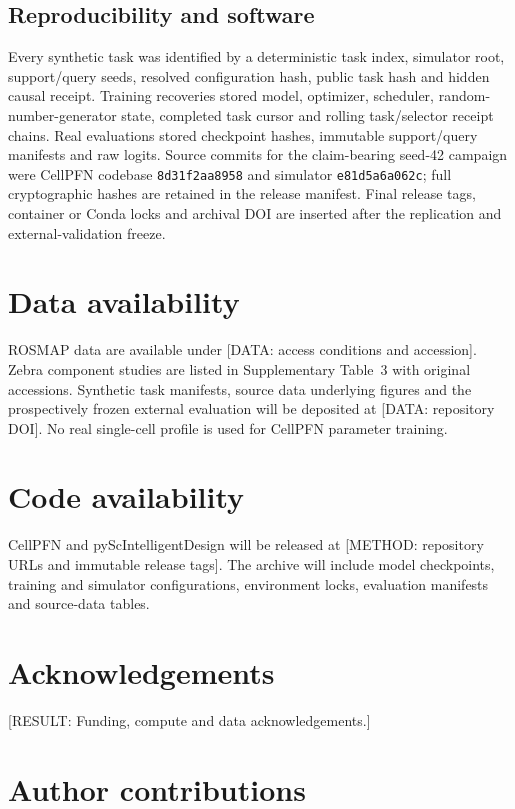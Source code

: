\documentclass[12pt]{article}
\newcommand{\resultplaceholder}[1]{\textcolor{red!75!black}{[RESULT: #1]}}
\newcommand{\methodplaceholder}[1]{\textcolor{blue!70!black}{[METHOD: #1]}}
\newcommand{\dataplaceholder}[1]{\textcolor{purple!70!black}{[DATA: #1]}}
\newcommand{\code}[1]{\texttt{#1}}
\begin{document}
\subsection*{Reproducibility and software}

Every synthetic task was identified by a deterministic task index, simulator root, support/query seeds, resolved configuration hash, public task hash and hidden causal receipt. Training recoveries stored model, optimizer, scheduler, random-number-generator state, completed task cursor and rolling task/selector receipt chains. Real evaluations stored checkpoint hashes, immutable support/query manifests and raw logits. Source commits for the claim-bearing seed-42 campaign were CellPFN codebase \code{8d31f2aa8958} and simulator \code{e81d5a6a062c}; full cryptographic hashes are retained in the release manifest. Final release tags, container or Conda locks and archival DOI are inserted after the replication and external-validation freeze.


\section*{Data availability}

ROSMAP data are available under \dataplaceholder{access conditions and accession}. Zebra component studies are listed in Supplementary Table~3 with original accessions. Synthetic task manifests, source data underlying figures and the prospectively frozen external evaluation will be deposited at \dataplaceholder{repository DOI}. No real single-cell profile is used for CellPFN parameter training.

\section*{Code availability}

CellPFN and pyScIntelligentDesign will be released at \methodplaceholder{repository URLs and immutable release tags}. The archive will include model checkpoints, training and simulator configurations, environment locks, evaluation manifests and source-data tables.

\section*{Acknowledgements}

\resultplaceholder{Funding, compute and data acknowledgements.}

\section*{Author contributions}
\end{document}
